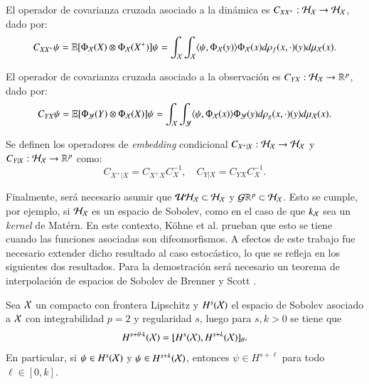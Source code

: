 \begin{defn}
    El operador de covarianza cruzada asociado a la dinámica es $C_{X X^+} : \mathcal{H}_{\mathcal{X}} \to \mathcal{H}_{\mathcal{X}}$, dado por:
	\begin{equation*}
		C_{X X^+} \psi = \mathbb{E}[\Phi_{\mathcal{X}} (X) \otimes \Phi_{\mathcal{X}} (X^+)] \psi = \int_{\mathcal{X}} \int_{\mathcal{X}} \langle \psi, \Phi_{\mathcal{X}} (y) \rangle \Phi_{\mathcal{X}} (x) d\rho_f (x, \cdot)(y) d \mu_{\mathcal{X}} (x).
	\end{equation*}
    
    El operador de covarianza cruzada asociado a la observación es $C_{YX} : \mathcal{H}_{\mathcal{X}} \to \mathbb{R}^p$, dado por:
	\begin{equation*}
		C_{Y X} \psi = \mathbb{E}[\Phi_{\mathcal{Y}} (Y) \otimes \Phi_{\mathcal{X}} (X)] \psi = \int_{\mathcal{X}} \int_{\mathcal{Y}} \langle \psi, \Phi_{\mathcal{X}} (x) \rangle \Phi_{\mathcal{Y}} (y) d\rho_g (x, \cdot)(y) d \mu_{\mathcal{X}} (x).
	\end{equation*}
\end{defn}

\begin{defn}   
    Se definen los operadores de \textit{embedding} condicional $C_{X^+ | X} : \mathcal{H}_{\mathcal{X}} \to \mathcal{H}_{\mathcal{X}}$ y $C_{Y | X} : \mathcal{H}_{\mathcal{X}} \to \mathbb{R}^p$ como:
	\begin{equation*}
		C_{X^+ | X} = C_{X^+ X} C_X^{-1}, \quad C_{Y | X} = C_{Y X} C_X^{-1}.
	\end{equation*}
\end{defn}

Finalmente, será necesario asumir que $\mathcal{U} \mathcal{H}_{\mathcal{X}} \subset \mathcal{H}_{\mathcal{X}}$ y $\mathcal{G} \mathbb{R}^p \subset \mathcal{H}_{\mathcal{X}}$. Esto se cumple, por ejemplo, si $\mathcal{H}_{\mathcal{X}}$ es un espacio de Sobolev, como en el caso de que $k_{\mathcal{X}}$ sea un \textit{kernel} de Matérn. En este contexto, Köhne et al. \cite{Kohne2024L-errorDecomposition} prueban que esto se tiene cuando las funciones asociadas son difeomorfismos. A efectos de este trabajo fue necesario extender dicho resultado al caso estocástico, lo que se refleja en los siguientes dos resultados. Para la demostración será necesario un teorema de interpolación de espacios de Sobolev de Brenner y Scott \cite{Brenner2008TheMethods}.

\begin{lema}
    \label{lema:interpolacion}
    Sea $\mathcal{X}$ un compacto con frontera Lipschitz y $H^s(\mathcal{X})$ el espacio de Sobolev asociado a $\mathcal{X}$ con integrabilidad $p=2$ y regularidad $s$, luego para $s, k > 0$ se tiene que
    \[
        H^{s+\theta \cdot k} (\mathcal{X}) = [H^s (\mathcal{X}), H^{s+k} (\mathcal{X})]_\theta.
    \]
    En particular, si $\psi \in H^{s}(\mathcal{X})$ y $\psi \in H^{s+k}(\mathcal{X})$, entonces $\psi \in H^{s+\ell}$ para todo $\ell \in [0, k]$.
\end{lema}

